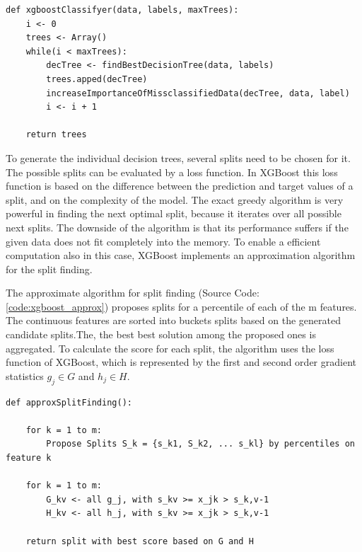 \begin{lstlisting}[style=py, caption={Pseudocode: Basic XGBoost}, label={code:xgboost}]
def xgboostClassifyer(data, labels, maxTrees):
    i <- 0
    trees <- Array()
    while(i < maxTrees):
        decTree <- findBestDecisionTree(data, labels)
        trees.apped(decTree)
        increaseImportanceOfMissclassifiedData(decTree, data, label)
        i <- i + 1
    
    return trees
\end{lstlisting}

To generate the individual decision trees, several splits need to be chosen for it. The possible splits can be evaluated by a loss function. In XGBoost this loss function is based on the difference between the prediction and target values of a split, and on the complexity of the model. The exact greedy algorithm is very powerful in finding the next optimal split, because it iterates over all possible next splits. The downside of the algorithm is that its performance suffers if the given data does not fit completely into the memory. To enable a efficient computation also in this case, XGBoost implements an approximation algorithm for the split finding. \cite{chen2016xgboost}

The approximate algorithm for split finding (Source Code: \ref{code:xgboost_approx}) proposes splits for a percentile of each of the m features. The continuous features are sorted into buckets splits based on the generated candidate splits.The, the best best solution among the proposed ones is aggregated. To calculate the score for each split, the algorithm uses the loss function of XGBoost, which is represented by the first and second order gradient statistics $g_j \in G$ and $h_j \in H$. 

\begin{lstlisting}[style=py, caption={Pseudocode: XGBoost - Approximate Algorithm for Split Finding \cite{chen2016xgboost} }, label={code:xgboost_approx}]
def approxSplitFinding():
    
    for k = 1 to m:
        Propose Splits S_k = {s_k1, S_k2, ... s_kl} by percentiles on feature k
    
    for k = 1 to m:
        G_kv <- all g_j, with s_kv >= x_jk > s_k,v-1
        H_kv <- all h_j, with s_kv >= x_jk > s_k,v-1
    
    return split with best score based on G and H
\end{lstlisting}









